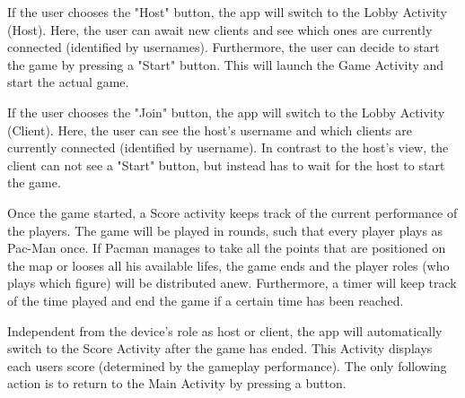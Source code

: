 \documentclass{report}
\begin{document}
If the user chooses the "Host" button, the app will switch to the Lobby Activity (Host).
Here, the user can await new clients and see which ones are currently connected (identified by usernames).
Furthermore, the user can decide to start the game by pressing a "Start" button.
This will launch the Game Activity and start the actual game.

If the user chooses the "Join" button, the app will switch to the Lobby Activity (Client).
Here, the user can see the host's username and which clients are currently connected (identified by username).
In contrast to the host's view, the client can not see a "Start" button, but instead has to wait for the host to start the game.

Once the game started, a Score activity keeps track of the current performance of the players. 
The game will be played in rounds, such that every player plays as Pac-Man once. 
If Pacman manages to take all the points that are positioned on the map or looses all his available lifes, the game ends and the player roles (who plays which figure) will be distributed anew. Furthermore, a timer will keep track of the time played and end the game if a certain time has been reached.

Independent from the device's role as host or client, the app will automatically switch to the Score Activity after the game has ended.
This Activity displays each users score (determined by the gameplay performance).
The only following action is to return to the Main Activity by pressing a button. 
 
\end{document}

